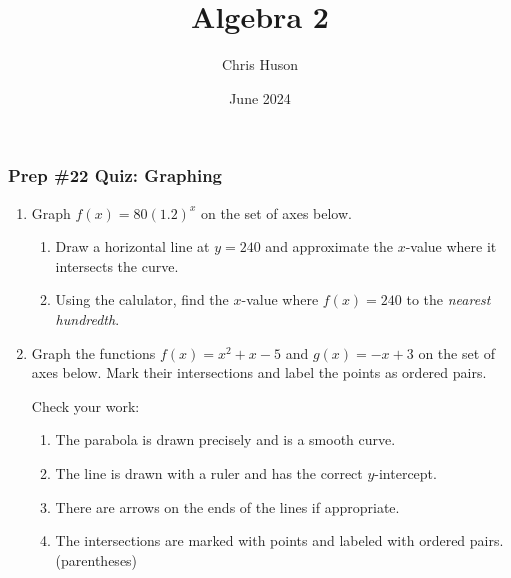 \documentclass[12pt, twoside]{article}
\title{Algebra 2}
\author{Chris Huson}
\date{June 2024}
\begin{document}
\subsubsection*{Prep \#22 Quiz: Graphing}
\begin{enumerate}[itemsep=0.5cm]
\item Graph $f(x)=80(1.2)^x$ on the set of axes below.
\begin{center}
    \end{center}  \vspace{0.5cm}
    \begin{enumerate}
        \item Draw a horizontal line at $y=240$ and approximate the $x$-value where it intersects the curve. \vspace{1cm}
        \item Using the calulator, find the $x$-value where $f(x)=240$ to the \emph{nearest hundredth}.
    \end{enumerate}

\newpage
\item Graph the functions $f(x) = x^2+x-5$ and $g(x) = -x+3$ on the set of axes below. Mark their intersections and label the points as ordered pairs. \vspace{1cm}
\begin{center}
    \end{center}
    Check your work:
    \begin{enumerate}[label=$\square$]
        \item The parabola is drawn precisely and is a smooth curve. 
        \item The line is drawn with a ruler and has the correct $y$-intercept.
        \item There are arrows on the ends of the lines if appropriate.
        \item The intersections are marked with points and labeled with ordered pairs. (parentheses)
    \end{enumerate}


\end{enumerate}
\end{document}
